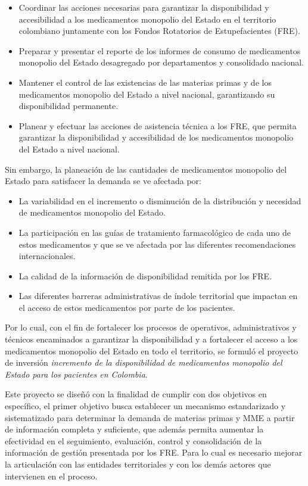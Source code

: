 \documentclass[
]{book}
\begin{document}
\begin{itemize}
\item
  Coordinar las acciones necesarias para garantizar la disponibilidad y accesibilidad a los medicamentos monopolio del Estado en el territorio colombiano juntamente con los Fondos Rotatorios de Estupefacientes (FRE).
\item
  Preparar y presentar el reporte de los informes de consumo de medicamentos monopolio del Estado desagregado por departamentos y consolidado nacional.
\item
  Mantener el control de las existencias de las materias primas y de los medicamentos monopolio del Estado a nivel nacional, garantizando su disponibilidad permanente.
\item
  Planear y efectuar las acciones de asistencia técnica a los FRE, que permita garantizar la disponibilidad y accesibilidad de los medicamentos monopolio del Estado a nivel nacional.
\end{itemize}

Sin embargo, la planeación de las cantidades de medicamentos monopolio del Estado para satisfacer la demanda se ve afectada por:

\begin{itemize}
\item
  La variabilidad en el incremento o disminución de la distribución y necesidad de medicamentos monopolio del Estado.
\item
  La participación en las guías de tratamiento farmacológico de cada uno de estos medicamentos y que se ve afectada por las diferentes recomendaciones internacionales.
\item
  La calidad de la información de disponibilidad remitida por los FRE.
\item
  Las diferentes barreras administrativas de índole territorial que impactan en el acceso de estos medicamentos por parte de los pacientes.
\end{itemize}

Por lo cual, con el fin de fortalecer los procesos de operativos, administrativos y técnicos encaminados a garantizar la disponibilidad y a fortalecer el acceso a los medicamentos monopolio del Estado en todo el territorio, se formuló el proyecto de inversión \emph{incremento de la disponibilidad de medicamentos monopolio del Estado para los pacientes en Colombia}.

Este proyecto se diseñó con la finalidad de cumplir con dos objetivos en específico, el primer objetivo busca establecer un mecanismo estandarizado y sistematizado para determinar la demanda de materias primas y MME a partir de información completa y suficiente, que además permita aumentar la efectividad en el seguimiento, evaluación, control y consolidación de la información de gestión presentada por los FRE. Para lo cual es necesario mejorar la articulación con las entidades territoriales y con los demás actores que intervienen en el proceso.
\end{document}

